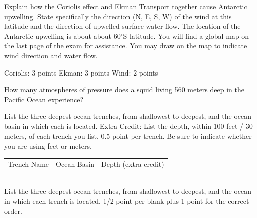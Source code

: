 \question[10]
Explain how the Coriolis effect and Ekman Transport together cause Antarctic upwelling. State specifically the direction (N, E, S, W) of the wind at this latitude and the direction of upwelled surface water flow.  The location of the Antarctic upwelling is about about 60$^\circ$S latitude.  You will find a global map on the last page of the exam for assistance.  You may draw on the map to indicate wind direction and water flow.


\begin{solution}
Coriolis: 3 points
Ekman: 3 points
Wind: 2 points
\end{solution}

\question[2]
How many atmospheres of pressure does a squid living 560 meters deep in the Pacific Ocean experience?



\question[5]
List the three deepest ocean trenches, from shallowest to deepest, and the ocean basin in which each is located.  Extra Credit: List the depth, within 100 feet / 30 meters, of each trench you list. 0.5 point per trench. Be sure to indicate whether you are using feet or meters.

\vspace{\baselineskip}

	\begin{tabular}{rll}
		\large Trench Name		&	\large Ocean Basin	&	\large Depth \small(extra credit) \\[4ex]
		\makebox[6cm][l]{\hrulefill} & \makebox[6cm][l]{\hrulefill} & \makebox[4cm][l]{\hrulefill} \\[45ex]
		\makebox[6cm][l]{\hrulefill} & \makebox[6cm][l]{\hrulefill} & \makebox[4cm][l]{\hrulefill}\\[4ex]
		\makebox[6cm][l]{\hrulefill} & \makebox[6cm][l]{\hrulefill} & \makebox[4cm][l]{\hrulefill} \\
	\end{tabular}

\question[3]
List the three deepest ocean trenches, from shallowest to deepest, and the ocean in which each trench is located.  1/2 point per blank plus 1 point for the correct order. 

\vspace{0.5\baselineskip}

